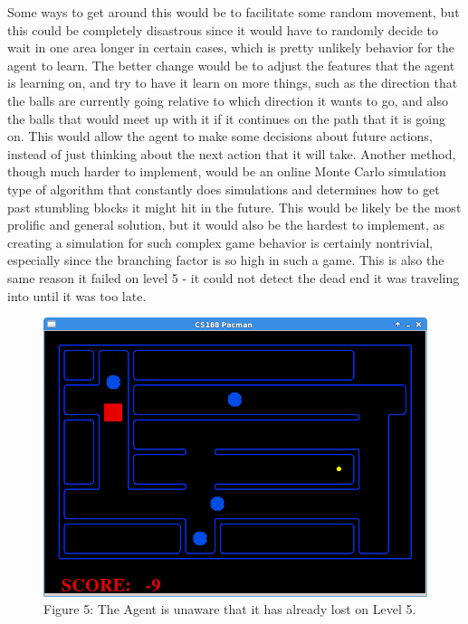 \documentclass[11pt]{article}
\begin{document}
Some ways to get around this would be to facilitate some random movement, but this could be completely disastrous since it would have to randomly decide to wait in one area longer in certain cases, which is pretty unlikely behavior for the agent to learn. The better change would be to adjust the features that the agent is learning on, and try to have it learn on more things, such as the direction that the balls are currently going relative to which direction it wants to go, and also the balls that would meet up with it if it continues on the path that it is going on. This would allow the agent to make some decisions about future actions, instead of just thinking about the next action that it will take. Another method, though much harder to implement, would be an online Monte Carlo simulation type of algorithm that constantly does simulations and determines how to get past stumbling blocks it might hit in the future. This would be likely be the most prolific and general solution, but it would also be the hardest to implement, as creating a simulation for such complex game behavior is certainly nontrivial, especially since the branching factor is so high in such a game. This is also the same reason it failed on level 5 - it could not detect the dead end it was traveling into until it was too late. 
\begin{figure}[t]
\centering

\includegraphics[scale = .4]{WHGL5.png} \newline \newline
Figure 5: The Agent is unaware that it has already lost on Level 5. 
\end{figure}
\end{document}
